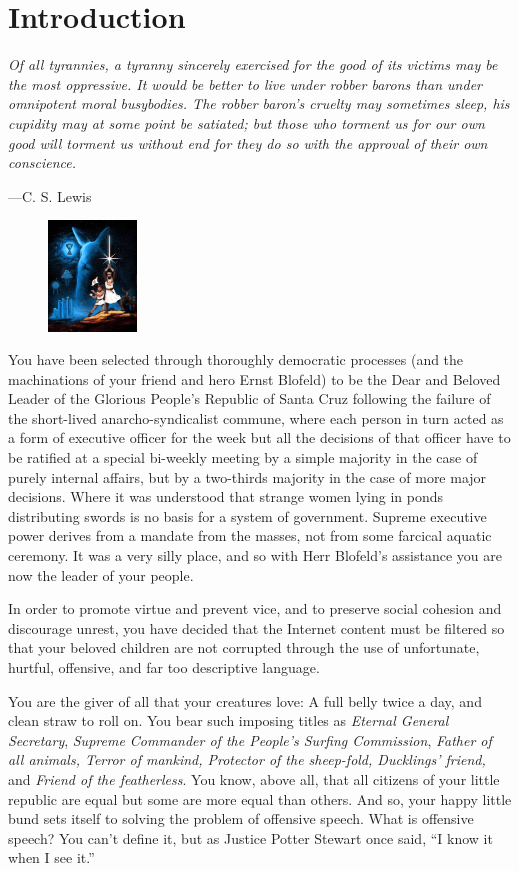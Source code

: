 \section{Introduction}

\textwidth
\epigraph{\emph
{Of all tyrannies, a tyranny sincerely exercised for the good of
its victims may be the most oppressive. It would be better to live
under robber barons than under omnipotent moral busybodies. The
robber baron's cruelty may sometimes sleep, his cupidity may at
some point be satiated; but those who torment us for our own good
will torment us without end for they do so with the approval of
their own conscience.}}{---C.\xspace S.\xspace Lewis}

\begin{figure}
\centering
        \includegraphics[width=0.21\textwidth]{images/grail-wars.jpg}
\end{figure}

\noindent You have been selected through thoroughly democratic processes
(and the machinations of your friend and hero Ernst Blofeld) to be the
Dear and Beloved Leader of the Glorious People's Republic of Santa Cruz
following the failure of the short-lived anarcho-syndicalist commune,
where each person in turn acted as a form of executive officer for the
week but all the decisions of that officer have to be ratified at a
special bi-weekly meeting by a simple majority in the case of purely
internal affairs, but by a two-thirds majority in the case of more major
decisions. Where it was understood that strange women lying in ponds
distributing swords is no basis for a system of government. Supreme
executive power derives from a mandate from the masses, not from some
farcical aquatic ceremony. It was a very silly place, and so with Herr
Blofeld's assistance you are now the leader of your people.

In order to promote virtue and prevent vice, and to preserve social
cohesion and discourage unrest, you have decided that the Internet
content must be filtered so that your beloved children are not corrupted
through the use of unfortunate, hurtful, offensive, and far too
descriptive language.

You are the giver of all that your creatures love: A full belly twice a
day, and clean straw to roll on.  You bear such imposing titles as
\emph{Eternal General Secretary}, \emph{Supreme Commander of the
People's Surfing Commission}, \emph{Father of all animals, Terror of
mankind, Protector of the sheep-fold, Ducklings' friend,} and
\emph{Friend of the featherless}. You know, above all, that all citizens
of your little republic are equal but some are more equal than others.
And so, your happy little bund sets itself to solving the problem of
offensive speech. What is offensive speech? You can't define it, but as
Justice Potter Stewart once said, ``I know it when I see it.''
